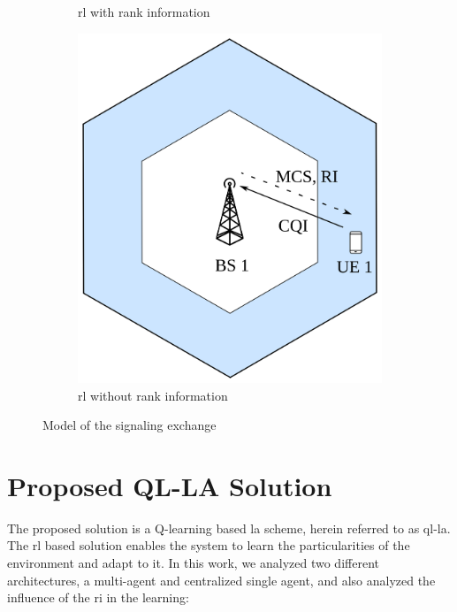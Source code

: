 \begin{figure}
\begin{subfigure}[htb]{0.3\textwidth}
         \caption{\gls{rl} with rank information}
         \label{fig:la-system-model-2}
     \end{subfigure}
     \hfill
     \begin{subfigure}[htb]{0.3\textwidth}
         \centering
         \includegraphics[width=\textwidth]{figures/chp_la/system_model_3.png}
         \caption{\gls{rl} without rank information}
         \label{fig:la-system-model-3}
     \end{subfigure}
        \caption{Model of the signaling exchange}
        \label{fig:la-system-model}
\end{figure}




\section{Proposed QL-LA Solution}
\label{sec:la-proposed}

The proposed solution is a Q-learning based \gls{la} scheme, herein referred to as \gls{ql-la}.
%
The \gls{rl} based solution enables the system to learn the particularities of the environment and adapt to it.
%
In this work, we analyzed two different architectures, a multi-agent and centralized single agent, and also analyzed the influence of the \gls{ri} in the learning:

